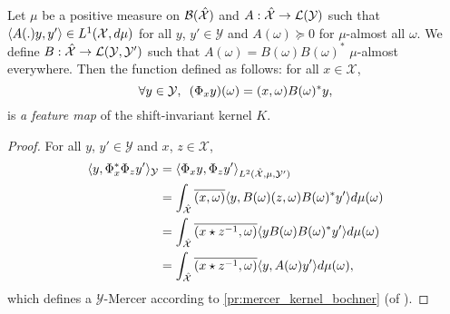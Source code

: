 \begin{proposition}\label{pr:fourier_feature_map}
Let $\mu$ be a positive measure on $\mathcal{B}(\hat{\mathcal{X}})$ and $A: \hat{\mathcal{X}}\to \mathcal{L}(\mathcal{Y})$ such that $\langle A(.)y,y'\rangle\in L^1(\mathcal{X},d\mu)$ for all $y$, $y'\in\mathcal{Y}$ and $A(\omega)\succcurlyeq 0$ for $\mu$-almost all $\omega$. We define $B:\hat{\mathcal{X}}\to\mathcal{L}(\mathcal{Y},\mathcal{Y}')$ such that $A(\omega) = B(\omega)B(\omega)^*$ $\mu$-almost everywhere. Then the function  defined as follows: for all $x \in \mathcal{X}$,  
\begin{equation}
\label{eq:feature_shiftinv_map}
\forall y \in \mathcal{Y}, \enskip(\Phi_x y)(\omega)=(x,\omega)B(\omega)^*y,
\end{equation}
is \emph{a feature map} of the shift-invariant kernel $K$. 
\end{proposition}
\begin{proof}
For all $y$, $y'\in \mathcal{Y}$ and $x$, $z\in\mathcal{X}$,
\begin{equation*}
\begin{aligned}
\langle y, \Phi_x^*\Phi_z y'\rangle_{\mathcal{Y}} &= \langle\Phi_x y, \Phi_z y'\rangle_{L^2(\hat{\mathcal{X}},\mu,\mathcal{Y}')} \\
&= \int_{\hat{\mathcal{X}}}\overline{(x,\omega)}\langle y, B(\omega)(z,\omega)B(\omega)^* y'\rangle d\mu(\omega) \\
&= \int_{\hat{\mathcal{X}}}\overline{(x \star z^{-1},\omega)}\langle y B(\omega)B(\omega)^* y'\rangle d\mu(\omega) \\
&= \int_{\hat{\mathcal{X}}}\overline{(x \star {z}^{-1},\omega)}\langle y,A(\omega)y'\rangle d\mu(\omega),
\end{aligned}
\end{equation*}
which defines a $\mathcal{Y}$-Mercer according to \cref{pr:mercer_kernel_bochner} (of \citet{Carmeli2010}).
\end{proof}

